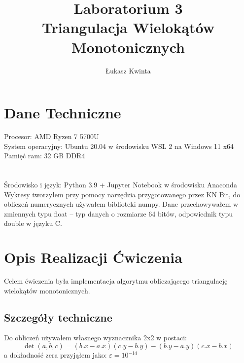 \documentclass[a4paper]{article}
\title{\fontsize{30pt}{30pt}\selectfont Laboratorium 3 \\ Triangulacja Wielokątów Monotonicznych}
\author{\fontsize{20pt}{20pt}\selectfont Łukasz Kwinta}
\date{}
\begin{document}
\maketitle
\Large
\vspace*{\fill}
\section{Dane Techniczne}
Procesor: AMD Ryzen 7 5700U\\
System operacyjny: Ubuntu 20.04 w środowisku WSL 2 na Windows 11 x64\\
Pamięć ram: 32 GB DDR4\\
\\
\\
Środowisko i język: Python 3.9 + Jupyter Notebook w środowisku Anaconda\\
Wykresy tworzyłem przy pomocy narzędzia przygotowanego przez KN Bit, 
do obliczeń numerycznych używałem biblioteki numpy.
 Dane przechowywałem w zmiennych typu float – typ danych o rozmiarze 64 bitów, 
 odpowiednik typu double w języku C.
\pagebreak
\section{Opis Realizacji Ćwiczenia}
Celem ćwiczenia była implementacja algorytmu obliczającego triangulację wielokątów 
monotonicznych.
    \subsection{Szczegóły techniczne}
    Do obliczeń używałem własnego wyznacznika 2x2 w postaci:
    \[
        \det{(a, b, c)} = (b.x - a.x)(c.y - b.y) - (b.y - a.y)(c.x - b.x)   
    \]
    a dokładność zera przyjąłem jako: $\varepsilon = 10^{-14}$
\end{document}
